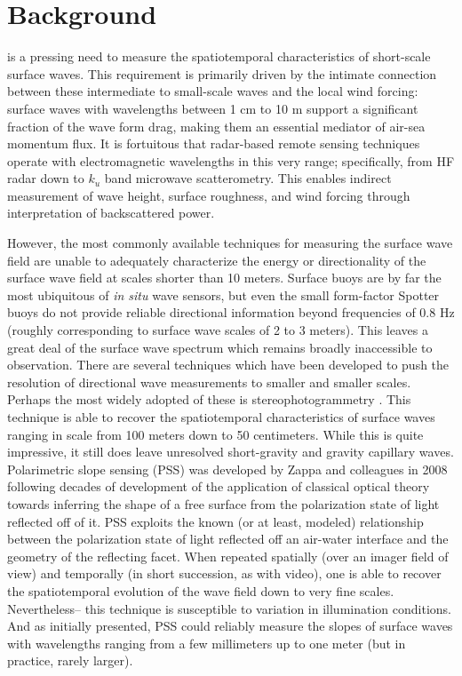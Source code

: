 \documentclass[letterpaper,journal]{IEEEtran}
\begin{document}
\IEEEpeerreviewmaketitle

\section{Background}
\label{sec:intro}
 is a pressing need to measure the spatiotemporal characteristics of short-scale surface waves. This requirement is primarily driven by the intimate connection between these intermediate to small-scale waves and the local wind forcing: surface waves with wavelengths between 1 cm to 10 m support a significant fraction of the wave form drag, making them an essential mediator of air-sea momentum flux. It is fortuitous that radar-based remote sensing techniques operate with electromagnetic wavelengths in this very range; specifically, from HF radar down to $k_u$ band microwave scatterometry. This enables indirect measurement of wave height, surface roughness, and wind forcing through interpretation of backscattered power.

However, the most commonly available techniques for measuring the surface wave field are unable to adequately characterize the energy or directionality of the surface wave field at scales shorter than 10 meters. Surface buoys are by far the most ubiquitous of \emph{in situ} wave sensors, but even the small form-factor Spotter buoys do not provide reliable directional information beyond frequencies of 0.8 Hz (roughly corresponding to surface wave scales of 2 to 3 meters). This leaves a great deal of the surface wave spectrum which remains broadly inaccessible to observation. There are several techniques which have been developed to push the resolution of directional wave measurements to smaller and smaller scales. Perhaps the most widely adopted of these is stereophotogrammetry \cite{Benetazzo2006,bergamasco_wass_2017}. This technique is able to recover the spatiotemporal characteristics of surface waves ranging in scale from 100 meters down to 50 centimeters. While this is quite impressive, it still does leave unresolved short-gravity and gravity capillary waves. Polarimetric slope sensing (PSS) was developed by Zappa and colleagues in 2008 \cite{Zappa2008} following decades of development of the application of classical optical theory towards inferring the shape of a free surface from the polarization state of light reflected off of it. PSS exploits the known (or at least, modeled) relationship between the polarization state of light reflected off an air-water interface and the geometry of the reflecting facet. When repeated spatially (over an imager field of view) and temporally (in short succession, as with video), one is able to recover the spatiotemporal evolution of the wave field down to very fine scales. Nevertheless-- this technique is susceptible to variation in illumination conditions. And as initially presented, PSS could reliably measure the slopes of surface waves with wavelengths ranging from a few millimeters up to one meter (but in practice, rarely larger).
\end{document}
